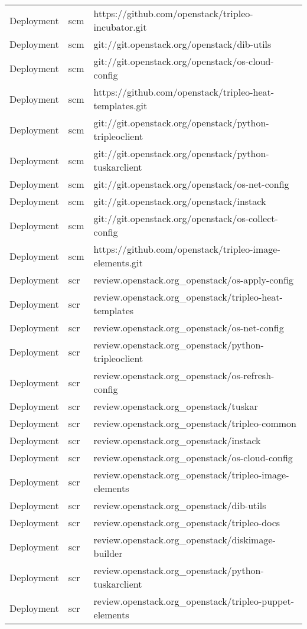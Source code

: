 \begin{center}
\begin{longtable}{|p{4cm}|p{1cm}|p{10cm}|}
Deployment&scm&https://github.com/openstack/tripleo-incubator.git\\ 
Deployment&scm&git://git.openstack.org/openstack/dib-utils\\ 
Deployment&scm&git://git.openstack.org/openstack/os-cloud-config\\ 
Deployment&scm&https://github.com/openstack/tripleo-heat-templates.git\\ 
Deployment&scm&git://git.openstack.org/openstack/python-tripleoclient\\ 
Deployment&scm&git://git.openstack.org/openstack/python-tuskarclient\\ 
Deployment&scm&git://git.openstack.org/openstack/os-net-config\\ 
Deployment&scm&git://git.openstack.org/openstack/instack\\ 
Deployment&scm&git://git.openstack.org/openstack/os-collect-config\\ 
Deployment&scm&https://github.com/openstack/tripleo-image-elements.git\\ 
Deployment&scr&review.openstack.org\_openstack/os-apply-config\\ 
Deployment&scr&review.openstack.org\_openstack/tripleo-heat-templates\\ 
Deployment&scr&review.openstack.org\_openstack/os-net-config\\ 
Deployment&scr&review.openstack.org\_openstack/python-tripleoclient\\ 
Deployment&scr&review.openstack.org\_openstack/os-refresh-config\\ 
Deployment&scr&review.openstack.org\_openstack/tuskar\\ 
Deployment&scr&review.openstack.org\_openstack/tripleo-common\\ 
Deployment&scr&review.openstack.org\_openstack/instack\\ 
Deployment&scr&review.openstack.org\_openstack/os-cloud-config\\ 
Deployment&scr&review.openstack.org\_openstack/tripleo-image-elements\\ 
Deployment&scr&review.openstack.org\_openstack/dib-utils\\ 
Deployment&scr&review.openstack.org\_openstack/tripleo-docs\\ 
Deployment&scr&review.openstack.org\_openstack/diskimage-builder\\ 
Deployment&scr&review.openstack.org\_openstack/python-tuskarclient\\ 
Deployment&scr&review.openstack.org\_openstack/tripleo-puppet-elements\\ 

\end{longtable}
\end{center}
